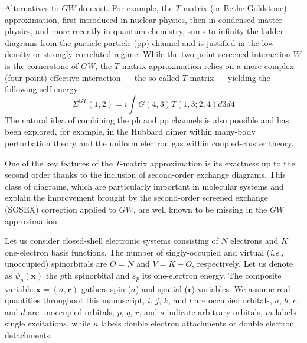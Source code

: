 \documentclass[aip,jcp,reprint,noshowkeys,superscriptaddress]{revtex4-1}
\newcommand{\ie}{\textit{i.e.}}
\newcommand{\br}{\mathbf{r}}
\newcommand{\bx}{\mathbf{x}}
\newcommand{\e}[2]{\eps_{#1}^{#2}}
\newcommand{\SO}[1]{\psi_{#1}}
\newcommand{\eps}{\varepsilon}
\begin{document}
Alternatives to $GW$ do exist. For example, the $T$-matrix (or Bethe-Goldstone) approximation, first introduced in nuclear physics, \cite{Bethe_1957,Baym_1961,Baym_1962,Danielewicz_1984a,Danielewicz_1984b} then in condensed matter physics, \cite{Liebsch_1981,Bickers_1989,Bickers_1991,Katsnelson_1999,Katsnelson_2002,Zhukov_2005,vonFriesen_2010,Romaniello_2012,Gukelberger_2015} and more recently in quantum chemistry, \cite{Zhang_2017,Li_2021b} sums to infinity the ladder diagrams from the particle-particle (pp) channel and is justified in the low-density or strongly-correlated regime. \cite{Danielewicz_1984a,Danielewicz_1984b,Liebsch_1981,Shepherd_2014}
While the two-point screened interaction $W$ is the cornerstone of $GW$, the $T$-matrix approximation relies on a more complex (four-point) effective interaction --- the so-called $T$ matrix --- yielding the following self-energy: 
\begin{equation}
\label{eq:SigGT}
	\Sigma^{GT}(1,2) = i \int G(4,3) T(1,3;2,4) d3 d4
\end{equation}
The natural idea of combining the ph and pp channels is also possible and has been explored, for example, in the Hubbard dimer within many-body perturbation theory \cite{Romaniello_2012} and the uniform electron gas \cite{Loos_2016} within coupled-cluster theory. \cite{Shepherd_2014}

One of the key features of the $T$-matrix approximation is its exactness up to the second order thanks to the inclusion of second-order exchange diagrams.
This class of diagrams, which are particularly important in molecular systems and explain the improvement brought by the second-order screened exchange (SOSEX) correction applied to $GW$, \cite{Romaniello_2009a,Ren_2015,Loos_2018b} are well known to be missing in the $GW$ approximation.

Let us consider closed-shell electronic systems consisting of $N$ electrons and $K$ one-electron basis functions.
The number of singly-occupied and virtual (\ie, unoccupied) spinorbitals are $O = N$ and $V = K - O$, respectively.
Let us denote as $\SO{p}(\bx)$ the $p$th spinorbital and $\e{p}{}$ its one-electron energy.
The composite variable $\bx = (\sigma,\br)$ gathers spin ($\sigma$) and spatial ($\br$) variables.
We assume real quantities throughout this manuscript, $i$, $j$, $k$, and $l$ are occupied orbitals, $a$, $b$, $c$, and $d$ are unoccupied orbitals, $p$, $q$, $r$, and $s$ indicate arbitrary orbitals, $m$ labels single excitations, while $n$ labels double electron attachments or double electron detachments.
\end{document}
